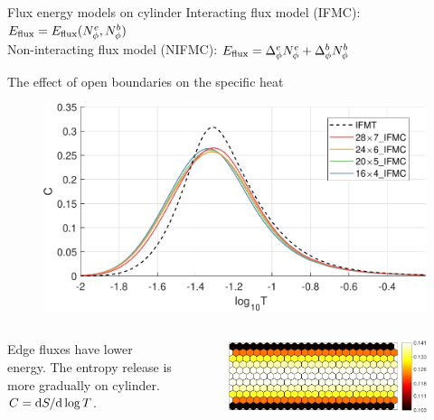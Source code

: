 \begin{frame}{Flux energy models on cylinder}
    \small
    Interacting flux model (IFMC): $E_{\textmd{flux}} = E_{\textmd{flux}}(N^e_\phi, N^b_\phi)$ \\
    Non-interacting flux model (NIFMC): $E_{\textmd{flux}}= \Delta_\phi^e N_\phi^e + \Delta_\phi^b N_\phi^b$ \\
\end{frame}



\begin{frame}{The effect of open boundaries on the specific heat}
    \begin{figure}
        \centering
        \begin{minipage}[c]{.75\textwidth}
            \includegraphics[width = 1\textwidth]{figures/C_cyltor.pdf}
        \end{minipage}
    \end{figure}
    \begin{columns}[t]
         Edge fluxes have lower energy. The entropy release is more gradually on cylinder. $C = \mathrm{d} S/ \mathrm{d} \log T$.
        
        \begin{figure}[t]
            \includegraphics[width = .7\textwidth]{figures/one_flux.pdf}
        \end{figure} 
    \end{columns}
\end{frame}


